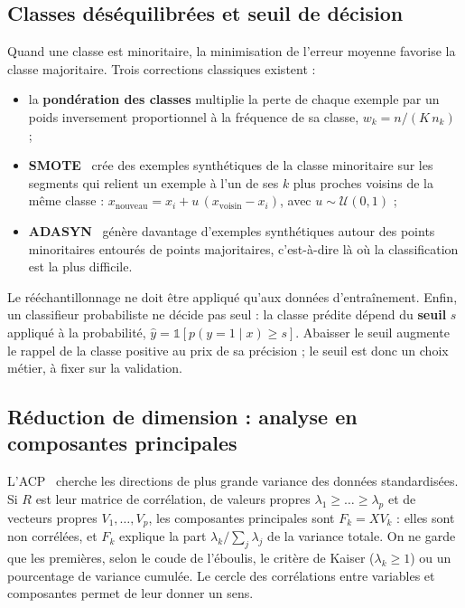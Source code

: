 \subsection{Classes déséquilibrées et seuil de décision}

Quand une classe est minoritaire, la minimisation de l'erreur moyenne favorise la classe majoritaire. Trois corrections classiques existent :
\begin{itemize}
  \item la \textbf{pondération des classes} multiplie la perte de chaque exemple par un poids inversement proportionnel à la fréquence de sa classe, $w_k = n / (K\, n_k)$ ;
  \item \textbf{SMOTE}~\cite{chawla2002} crée des exemples synthétiques de la classe minoritaire sur les segments qui relient un exemple à l'un de ses $k$ plus proches voisins de la même classe : $x_{\text{nouveau}} = x_i + u\,(x_{\text{voisin}} - x_i)$, avec $u \sim \mathcal{U}(0,1)$ ;
  \item \textbf{ADASYN}~\cite{he2008} génère davantage d'exemples synthétiques autour des points minoritaires entourés de points majoritaires, c'est-à-dire là où la classification est la plus difficile.
\end{itemize}
Le rééchantillonnage ne doit être appliqué qu'aux données d'entraînement. Enfin, un classifieur probabiliste ne décide pas seul : la classe prédite dépend du \textbf{seuil} $s$ appliqué à la probabilité, $\hat y = \mathbb{1}[p(y=1\mid x) \geq s]$. Abaisser le seuil augmente le rappel de la classe positive au prix de sa précision ; le seuil est donc un choix métier, à fixer sur la validation.

\subsection{Réduction de dimension : analyse en composantes principales}

L'ACP~\cite{pearson1901} cherche les directions de plus grande variance des données standardisées. Si $R$ est leur matrice de corrélation, de valeurs propres $\lambda_1 \geq \dots \geq \lambda_p$ et de vecteurs propres $V_1, \dots, V_p$, les composantes principales sont $F_k = X V_k$ : elles sont non corrélées, et $F_k$ explique la part $\lambda_k / \sum_j \lambda_j$ de la variance totale. On ne garde que les premières, selon le coude de l'éboulis, le critère de Kaiser ($\lambda_k \geq 1$) ou un pourcentage de variance cumulée. Le cercle des corrélations entre variables et composantes permet de leur donner un sens.

